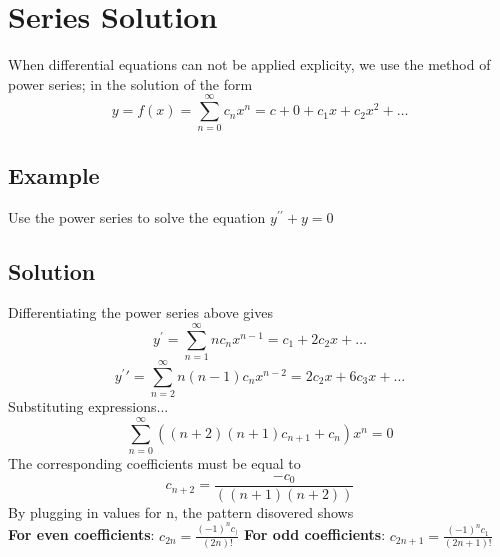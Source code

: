 \section{Series Solution}
When differential equations can not be applied explicity, we use the method of power series; in the solution of the form\\
$$y = f(x) = \sum^\infty_{n=0}c_nx^n = c+0 + c_1x + c_2x^2 + \dots$$

\subsection*{Example}
Use the power series to solve the equation $y^{\prime\prime} + y = 0$
\subsection*{Solution}
Differentiating the power series above gives
$$y^\prime = \sum^\infty_{n=1}nc_nx^{n-1} = c_1 + 2c_2x + \dots$$
$$y^\prime\prime = \sum^\infty_{n=2}n(n-1)c_nx^{n-2} = 2c_2x + 6c_3x + \dots$$
Substituting expressions...$$\sum^\infty_{n = 0}((n+2)(n+1)c_{n+1}+c_n)x^n = 0$$
The corresponding coefficients must be equal to
$$c_{n+2} = \frac{-c_0}{((n+1)(n+2))}$$
By plugging in values for n, the pattern disovered shows\\
\textbf{For even coefficients}: $c_{2n} = \frac{(-1)^nc_)}{(2n)!}$
\textbf{For odd coefficients}: $c_{2n+1} = \frac{(-1)^nc_1}{(2n+1)!}$ 
